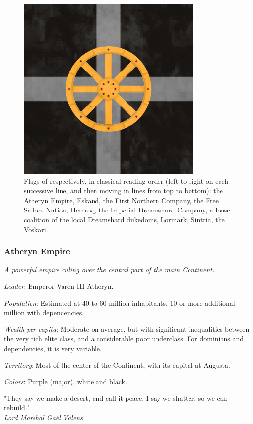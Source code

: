 \begin{figure}[!ht]
        \includegraphics[scale=0.25]{img/flag/voskari.png}

    \caption{Flags of respectively, in classical reading order (left to right on each successive line, and then moving in lines from top to bottom): the Atheryn Empire, Eskand, the First Northern Company, the Free Sailors Nation, Hereroq, the Imperial Dreamshard Company, a loose coalition of the local Dreamshard dukedoms, Lormark, Sintria, the Voskari.}
    \label{flags}
\end{figure}





\subsubsection{Atheryn Empire}


\textit{A powerful empire ruling over the central part of the main Continent.}

\textit{Leader}: Emperor Varen III Atheryn.

\textit{Population}: Estimated at 40 to 60 million inhabitants, 10 or more additional million with dependencies.

\textit{Wealth per capita}: Moderate on average, but with significant inequalities between the very rich elite class, and a considerable poor underclass. For dominions and dependencies, it is very variable.

\textit{Territory}: Most of the center of the Continent, with its capital at Augusta.
    
\textit{Colors}: Purple (major), white and black.


\begin{rpg-quotebox}
    "They say we make a desert, and call it peace. I say we shatter, so we can rebuild." \\ \textendash \textit{Lord Marshal Gaël Valens}
\end{rpg-quotebox}

